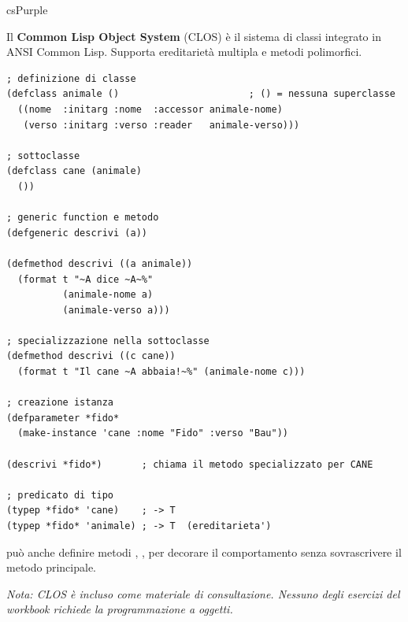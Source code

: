 \begin{refbox}{csPurple}
\label{sec:clos}

Il \textbf{Common Lisp Object System} (CLOS) è il sistema di
classi integrato in ANSI Common Lisp. Supporta ereditarietà
multipla e metodi polimorfici.

\begin{lstlisting}
; definizione di classe
(defclass animale ()                       ; () = nessuna superclasse
  ((nome  :initarg :nome  :accessor animale-nome)
   (verso :initarg :verso :reader   animale-verso)))

; sottoclasse
(defclass cane (animale)
  ())

; generic function e metodo
(defgeneric descrivi (a))

(defmethod descrivi ((a animale))
  (format t "~A dice ~A~%"
          (animale-nome a)
          (animale-verso a)))

; specializzazione nella sottoclasse
(defmethod descrivi ((c cane))
  (format t "Il cane ~A abbaia!~%" (animale-nome c)))

; creazione istanza
(defparameter *fido*
  (make-instance 'cane :nome "Fido" :verso "Bau"))

(descrivi *fido*)       ; chiama il metodo specializzato per CANE

; predicato di tipo
(typep *fido* 'cane)    ; -> T
(typep *fido* 'animale) ; -> T  (ereditarieta')
\end{lstlisting}

 può anche definire metodi ,
,  per decorare il comportamento
senza sovrascrivere il metodo principale.

\medskip
\textit{\small Nota: CLOS è incluso come materiale di consultazione.
Nessuno degli esercizi del workbook richiede la programmazione a oggetti.}

\end{refbox}


